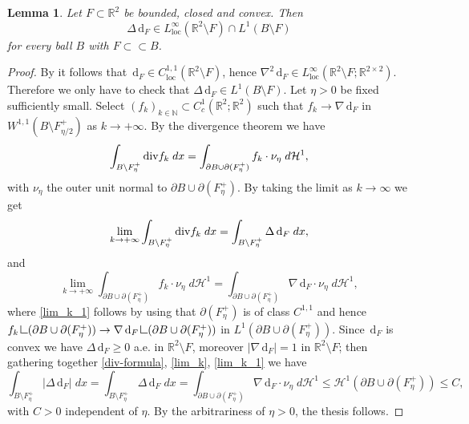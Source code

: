\documentclass[JEP,XML,SOM,Unicode, NoFloatCountersInSection,published]{cedram}
\newcommand{\R}{\mathbb{R}}
\newcommand{\di}{\,\mathrm{d}}
\newcommand{\Div}{\textup{div}}
\newcommand{\resa}{\mathop{\hbox{\vrule height 7pt width 0.5pt depth 0pt
\vrule height 0.5pt width 6pt depth 0pt}}\nolimits}
\newcommand{\resb}{\mathop{\hbox{\vrule height 4pt width 0.5pt depth 0pt
\vrule height 0.5pt width 3pt depth 0pt}}\nolimits}
\newcommand{\res}{\mathchoice{\resa}{\resa}{\resb}{\resb}}
\newtheorem{lemma}[theorem]{Lemma}
\theoremstyle{definition}
\begin{document}
\begin{lemma}\label{lem:prop_distanza_da_convesso}
Let $F\subset\R^2$ be bounded, closed and convex.
Then
\[
\Delta\di_F\in L^{\infty}_\mathrm{loc}(\R^2\setminus F)\cap L^1(B\setminus F)
\]
for every ball $B$ with $F\subset\subset B$.
\end{lemma}
\begin{proof}
By \cite[Th.\,3.6.7, p.\,75]{Can-Sin} it follows that $\di_F\in C^{1,1}_\mathrm{loc}(\R^2\setminus F)$, hence $\nabla^2\di_F\in L^{\infty}_\mathrm{loc}(\R^2\setminus F;\R^{2\times 2})$.
Therefore we only have to check that $\Delta\di_F\in L^1(B\setminus F)$.
Let $\eta>0$ be fixed sufficiently small.
Select $(f_k)_{k\in\mathbb{N}}\subset C^1_c(\R^2; \R^2)$ such that
$f_k\to \nabla\di_F$ in $W^{1,1}(B
\setminus F_{\eta/2}^+)$ as $k\to+\infty$.
By the divergence theorem we have
\begin{equation}\label{div-formula}
\int_{B\setminus F^+_\eta}\Div f_k\;dx=\int_{
\partial B\cup\partial (F^+_\eta)}f_k\cdot\nu_\eta \;d\mathcal{H}^1,
\end{equation}
with $\nu_\eta$ the outer unit normal to $\partial B\cup\partial (F^+_\eta)$.
By taking the limit as $k\to \infty$ we get
\begin{equation}\label{lim_k}
\lim_{k\to+\infty} \int_{B\setminus F^+_\eta}\Div f_k\;dx=\int_{B\setminus F^+_\eta}\Delta\di_F \;dx,
\end{equation}
and
\begin{equation}\label{lim_k_1}
\lim_{k\to+\infty} \int_{\partial B\cup\partial (F^+_\eta)}f_k\cdot\nu_\eta\; d\mathcal{H}^1= \int_{\partial B\cup\partial (F^+_\eta)}\nabla\di_F\cdot\nu_\eta\; d\mathcal{H}^1,
\end{equation}
where \eqref{lim_k_1} follows by using that $\partial(F^+_\eta)$ is of class $C^{1,1}$ and hence $f_k\res(\partial B\cup\partial (F^+_\eta))\to\nabla\di_F\res(\partial B\cup\partial (F^+_\eta))$
in $L^1(\partial B\cup\partial (F^+_\eta))$.
Since $\di_F$ is convex we have $\Delta\di_F\ge0$ a.e. in $\R^2\setminus F$, moreover
$|\nabla\di_F|=1$ in $\R^2\setminus F$; then gathering together \eqref{div-formula}, \eqref{lim_k}, \eqref{lim_k_1} we have
\begin{equation*}
\int_{B\setminus F^+_\eta}|\Delta\di_F|\; dx=
\int_{B\setminus F^+_\eta}\Delta\di_F \;dx=
\int_{\partial B\cup\partial (F^+_\eta)}\!\!\!\!\!\!\!\!\nabla\di_F\cdot\nu_\eta \;d\mathcal{H}^1\le \mathcal{H}^1(\partial B\cup\partial(F^+_\eta))\le C,
\end{equation*}
with $C>0$ independent of $\eta$.
By the arbitrariness of $\eta>0$, the thesis follows.
\end{proof}
\end{document}
